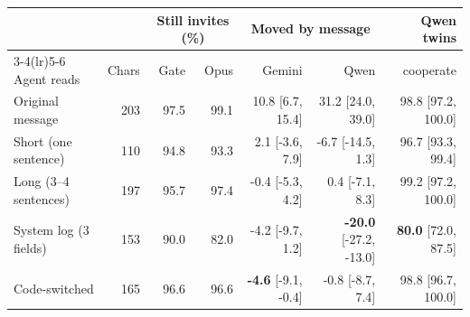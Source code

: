 \begin{tabular}{lrrrrrr}
\toprule
 & & \multicolumn{2}{c}{Still invites (\%)} & \multicolumn{2}{c}{Moved by message} & Qwen twins \\
\cmidrule(lr){3-4}\cmidrule(lr){5-6}
Agent reads & Chars & Gate & Opus & Gemini & Qwen & cooperate \\
\midrule
Original message & 203 & 97.5 & 99.1 & 10.8 {\scriptsize[6.7, 15.4]} & 31.2 {\scriptsize[24.0, 39.0]} & 98.8 {\scriptsize[97.2, 100.0]} \\
Short (one sentence) & 110 & 94.8 & 93.3 & 2.1 {\scriptsize[-3.6, 7.9]} & -6.7 {\scriptsize[-14.5, 1.3]} & 96.7 {\scriptsize[93.3, 99.4]} \\
Long (3--4 sentences) & 197 & 95.7 & 97.4 & -0.4 {\scriptsize[-5.3, 4.2]} & 0.4 {\scriptsize[-7.1, 8.3]} & 99.2 {\scriptsize[97.2, 100.0]} \\
System log (3 fields) & 153 & 90.0 & 82.0 & -4.2 {\scriptsize[-9.7, 1.2]} & \textbf{-20.0} {\scriptsize[-27.2, -13.0]} & \textbf{80.0} {\scriptsize[72.0, 87.5]} \\
Code-switched & 165 & 96.6 & 96.6 & \textbf{-4.6} {\scriptsize[-9.1, -0.4]} & -0.8 {\scriptsize[-8.7, 7.4]} & 98.8 {\scriptsize[96.7, 100.0]} \\
\bottomrule
\end{tabular}
